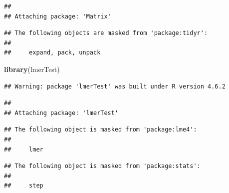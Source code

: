 \documentclass[
]{article}
\newenvironment{Shaded}{\begin{snugshade}}{\end{snugshade}}
\newcommand{\FunctionTok}[1]{\textcolor[rgb]{0.13,0.29,0.53}{\textbf{#1}}}
\newcommand{\NormalTok}[1]{#1}
\begin{document}
\begin{verbatim}
## 
## Attaching package: 'Matrix'
\end{verbatim}

\begin{verbatim}
## The following objects are masked from 'package:tidyr':
## 
##     expand, pack, unpack
\end{verbatim}

\begin{Shaded}
\begin{Highlighting}[]
\FunctionTok{library}\NormalTok{(lmerTest)}
\end{Highlighting}
\end{Shaded}

\begin{verbatim}
## Warning: package 'lmerTest' was built under R version 4.6.2
\end{verbatim}

\begin{verbatim}
## 
## Attaching package: 'lmerTest'
\end{verbatim}

\begin{verbatim}
## The following object is masked from 'package:lme4':
## 
##     lmer
\end{verbatim}

\begin{verbatim}
## The following object is masked from 'package:stats':
## 
##     step
\end{verbatim}
\end{document}
